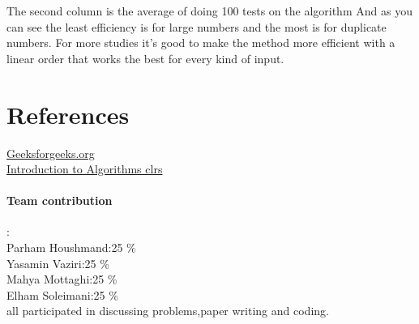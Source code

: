 \documentclass[
10pt, %
a4paper, %
oneside, %
headinclude,footinclude, %
BCOR5mm, %
]{scrartcl}
\begin{document}
The second column is the average of doing 100 tests on the algorithm And as you can see the least efficiency is for large numbers and the most is for duplicate numbers. For more studies it's good to make the method more efficient with a linear order that works the best for every kind of input.


\section{References}
 \href{https://www.geeksforgeeks.org/}{Geeksforgeeks.org}
 \\
 \href{https://www.amazon.com/Introduction-Algorithms-3rd-MIT-Press/dp/0262033844}{Introduction to Algorithms clrs}
 

\paragraph{Team contribution} :
\\
Parham Houshmand:25 \%
\\
Yasamin Vaziri:25 \%
\\
Mahya Mottaghi:25 \% 
\\
Elham Soleimani:25 \%
\\
all participated in discussing problems,paper writing and coding.
\label{fig:esempio}



\renewcommand{\refname}{\spacedlowsmallcaps{References}} %



 
\end{document}
